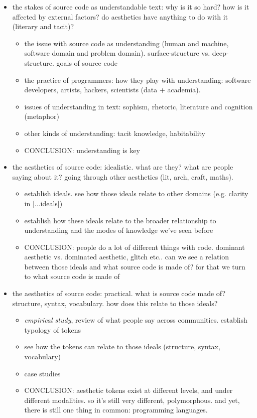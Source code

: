 \begin{itemize}
    \item the stakes of source code as understandable text: why is it so hard? how is it affected by external factors? do aesthetics have anything to do with it (literary and tacit)?
    \begin{itemize}
        \item the issue with source code as understanding (human and machine, software domain and problem domain). surface-structure vs. deep-structure. goals of source code
        \item the practice of programmers: how they play with understanding: software developers, artists, hackers, scientists (data + academia).
        \item issues of understanding in text: sophism, rhetoric, literature and cognition (metaphor)
        \item other kinds of understanding: tacit knowledge, habitability
        \item CONCLUSION: understanding is key 
    \end{itemize}

    \item the aesthetics of source code: idealistic. what are they? what are people saying about it? going through other aesthetics (lit, arch, craft, maths).
    \begin{itemize}
        \item establish ideals. see how those ideals relate to other domains (e.g. clarity in [...ideals])
        \item establish how these ideals relate to the broader relationship to understanding and the modes of knowledge we've seen before
        \item CONCLUSION: people do a lot of different things with code. dominant aesthetic vs. dominated aesthetic, glitch etc.. can we see a relation between those ideals and what source code is made of? for that we turn to what source code is made of
    \end{itemize}
    
    \item the aesthetics of source code: practical. what is source code made of? structure, syntax, vocabulary. how does this relate to those ideals?
    \begin{itemize}
        \item \emph{empirical study}, review of what people say across communities. establish typology of tokens
        \item see how the tokens can relate to those ideals (structure, syntax, vocabulary)
        \item case studies
        \item CONCLUSION: aesthetic tokens exist at different levels, and under different modalities. so it's still very different, polymorphous. and yet, there is still one thing in common: programming languages.
    \end{itemize}


\end{itemize}
